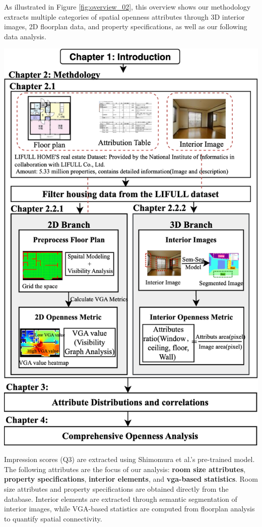 \documentclass[11pt,a4paper]{article}
\begin{document}
\begin{multicols}{2}
As illustrated in Figure \ref{fig:overview_02}, this overview shows our methodology extracts multiple categories of spatial openness 
attributes through 3D interior images, 2D floorplan data, and property specifications, as well as our following data analysis. 
\begin{center}
    \includegraphics[width=0.95\columnwidth]{plots/overview.png}
    \label{fig:overview_02}
\end{center}
Impression scores (Q3) are extracted using Shimomura et al.'s pre-trained model.
The following attributes are the focus of our analysis:
\textbf{room size attributes}, \textbf{property specifications}, \textbf{interior elements}, and \textbf{vga-based statistics}.
Room size attributes and property specifications are obtained directly from the database.
Interior elements are extracted through semantic segmentation of interior images, 
while VGA-based statistics are computed from floorplan analysis to quantify spatial connectivity. 


\end{multicols}
\end{document}
